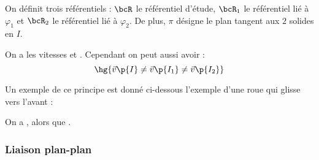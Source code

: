     On définit trois référentiels : $\bcR$ le référentiel d'étude, $\bcR_1$ le référentiel lié à $\varphi_1$ et $\bcR_2$ le référentiel lié à $\varphi_2$. De plus, $\pi$ désigne le plan tangent aux $2$ solides en $I$.
    
    \begin{warning}{}{}
        On a les vitesses  et . Cependant on peut aussi avoir :
        \[ \hg{\vec v\p{I} \neq \vec v\p{I_1} \neq \vec v\p{I_2}}\]
    \end{warning}
    Un exemple de ce principe est donné ci-dessous l'exemple d'une roue qui glisse vers l'avant :
    \begin{example}{}{}
        \begin{minipage}{0.48\linewidth}
            \centering
        \end{minipage}
        \begin{minipage}{0.48\linewidth}
            On a , alors que .
        \end{minipage}
    \end{example}
    
    \subsubsection{Liaison plan-plan}
    
